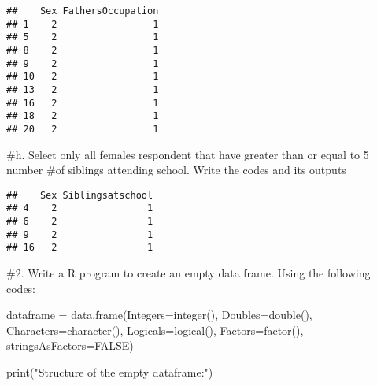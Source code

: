 \documentclass[
]{article}
\newenvironment{Shaded}{\begin{snugshade}}{\end{snugshade}}
\newcommand{\AttributeTok}[1]{\textcolor[rgb]{0.77,0.63,0.00}{#1}}
\newcommand{\ConstantTok}[1]{\textcolor[rgb]{0.00,0.00,0.00}{#1}}
\newcommand{\DecValTok}[1]{\textcolor[rgb]{0.00,0.00,0.81}{#1}}
\newcommand{\FunctionTok}[1]{\textcolor[rgb]{0.00,0.00,0.00}{#1}}
\newcommand{\NormalTok}[1]{#1}
\newcommand{\OtherTok}[1]{\textcolor[rgb]{0.56,0.35,0.01}{#1}}
\newcommand{\SpecialCharTok}[1]{\textcolor[rgb]{0.00,0.00,0.00}{#1}}
\newcommand{\StringTok}[1]{\textcolor[rgb]{0.31,0.60,0.02}{#1}}
\begin{document}
\begin{verbatim}
##    Sex FathersOccupation
## 1    2                 1
## 5    2                 1
## 8    2                 1
## 9    2                 1
## 10   2                 1
## 13   2                 1
## 16   2                 1
## 18   2                 1
## 20   2                 1
\end{verbatim}

\#h. Select only all females respondent that have greater than or equal
to 5 number \#of siblings attending school. Write the codes and its
outputs

\begin{Shaded}
\end{Shaded}

\begin{verbatim}
##    Sex Siblingsatschool
## 4    2                1
## 6    2                1
## 9    2                1
## 16   2                1
\end{verbatim}

\#2. Write a R program to create an empty data frame. Using the
following codes:

\begin{Shaded}
\begin{Highlighting}[]
\NormalTok{dataframe }\OtherTok{=} \FunctionTok{data.frame}\NormalTok{(}\AttributeTok{Integers=}\FunctionTok{integer}\NormalTok{(),}
                \AttributeTok{Doubles=}\FunctionTok{double}\NormalTok{(), }
                \AttributeTok{Characters=}\FunctionTok{character}\NormalTok{(),}
                \AttributeTok{Logicals=}\FunctionTok{logical}\NormalTok{(),}
                \AttributeTok{Factors=}\FunctionTok{factor}\NormalTok{(),}
                \AttributeTok{stringsAsFactors=}\ConstantTok{FALSE}\NormalTok{)}

          \FunctionTok{print}\NormalTok{(}\StringTok{"Structure of the empty dataframe:"}\NormalTok{)}
\end{Highlighting}
\end{Shaded}
\end{document}
